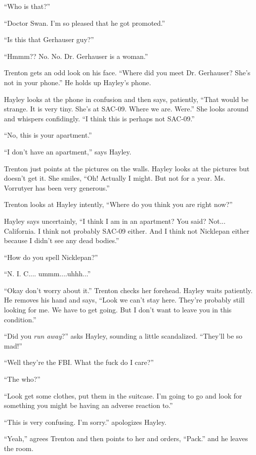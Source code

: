 ``Who is that?''

``Doctor Swan.  I'm so pleased that he got promoted.''

``Is this that Gerhauser guy?''

``Hmmm??  No. No.  Dr. Gerhauser is a woman.''

Trenton gets an odd look on his face.  ``Where did you meet Dr. Gerhauser?  She's not in your phone.''  He holds up Hayley's phone.  

Hayley looks at the phone in confusion and then says, patiently, ``That would be strange.  It is very tiny.  She's at SAC-09.   Where we are.  Were.''  She looks around and whispers confidingly.  ``I think this is perhaps not SAC-09.''

``No, this is your apartment.''

``I don't have an apartment,'' says Hayley.

Trenton just points at the pictures on the walls.  Hayley looks at the pictures but doesn't get it.  She smiles, ``Oh!  Actually I might.  But not for a year.  Ms. Vorrutyer has been very generous.''

Trenton looks at Hayley intently, ``Where do you think you are right now?''

Hayley says uncertainly, ``I think I am in an apartment?  You said?   Not... California.  I think not probably SAC-09 either.  And I think not Nicklepan either because I didn't see any dead bodies.''

``How do you spell Nicklepan?''

``N.  I.  C.... ummm....uhhh...''

``Okay don't worry about it.''  Trenton checks her forehead.  Hayley waits patiently.  He removes his hand and says, ``Look we can't stay here.  They're probably still looking for me. We have to get going.  But I don't want to leave you in this condition.''

``Did you \textit{run away}?'' asks Hayley, sounding a little scandalized.  ``They'll be so mad!''

``Well they're the FBI. What the fuck do I care?''

``The who?''

``Look get some clothes, put them in the suitcase.  I'm going to go and look for something you might be having an adverse reaction to.''

``This is very confusing.  I'm sorry.'' apologizes Hayley.

``Yeah,'' agrees Trenton and then points to her and orders, ``Pack.'' and he leaves the room.



